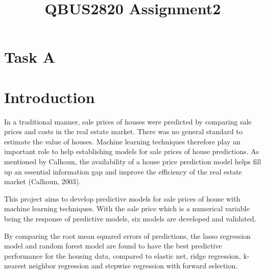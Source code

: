 \documentclass[letterpaper,12pt,twoside,]{pinp}
\title{QBUS2820 Assignment2}
\author[]{}
\begin{document}
\verticaladjustment{-2pt}

\maketitle
\thispagestyle{firststyle}




\hypertarget{task-a}{%
\section{Task A}\label{task-a}}

\hypertarget{introduction}{%
\section{Introduction}\label{introduction}}

In a traditional manner, sale prices of houses were predicted by
comparing sale prices and costs in the real estate market. There was no
general standard to estimate the value of houses. Machine learning
techniques therefore play an important role to help establishing models
for sale prices of house predictions. As mentioned by Calhoun, the
availability of a house price prediction model helps fill up an
essential information gap and improve the efficiency of the real estate
market (Calhoun, 2003).

This project aims to develop predictive models for sale prices of house
with machine learning techniques. With the sale price which is a
numerical variable being the response of predictive models, six models
are developed and validated.

By comparing the root mean squared errors of predictions, the lasso
regression model and random forest model are found to have the best
predictive performance for the housing data, compared to elastic net,
ridge regression, k-nearest neighbor regression and stepwise regression
with forward selection.
\end{document}
